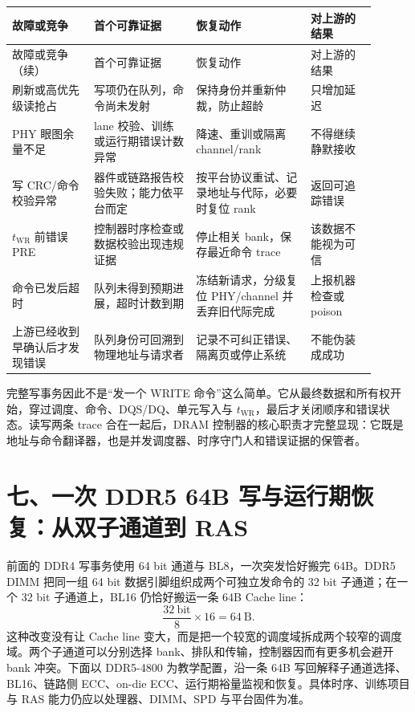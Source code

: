 \begin{longtable}{L{0.20\linewidth}L{0.25\linewidth}L{0.29\linewidth}L{0.16\linewidth}}
\toprule
故障或竞争 & 首个可靠证据 & 恢复动作 & 对上游的结果 \\
\midrule
\endfirsthead
\toprule
故障或竞争（续） & 首个可靠证据 & 恢复动作 & 对上游的结果 \\
\midrule
\endhead
刷新或高优先级读抢占 & 写项仍在队列，命令尚未发射 & 保持身份并重新仲裁，防止超龄 & 只增加延迟 \\\tablerowrule
PHY 眼图余量不足 & lane 校验、训练或运行期错误计数异常 & 降速、重训或隔离 channel/rank & 不得继续静默接收 \\\tablerowrule
写 CRC/命令校验异常 & 器件或链路报告校验失败；能力依平台而定 & 按平台协议重试、记录地址与代际，必要时复位 rank & 返回可追踪错误 \\\tablerowrule
$t_{\mathrm{WR}}$ 前错误 PRE & 控制器时序检查或数据校验出现违规证据 & 停止相关 bank，保存最近命令 trace & 该数据不能视为可信 \\\tablerowrule
命令已发后超时 & 队列未得到预期进展，超时计数到期 & 冻结新请求，分级复位 PHY/channel 并丢弃旧代际完成 & 上报机器检查或 poison \\\tablerowrule
上游已经收到早确认后才发现错误 & 队列身份可回溯到物理地址与请求者 & 记录不可纠正错误、隔离页或停止系统 & 不能伪装成成功 \\
\bottomrule
\end{longtable}

完整写事务因此不是“发一个 WRITE 命令”这么简单。它从最终数据和所有权开始，穿过调度、命令、DQS/DQ、单元写入与 $t_{\mathrm{WR}}$，最后才关闭顺序和错误状态。读写两条 trace 合在一起后，DRAM 控制器的核心职责才完整显现：它既是地址与命令翻译器，也是并发调度器、时序守门人和错误证据的保管者。
\section{七、一次 DDR5 64B 写与运行期恢复：从双子通道到 RAS}

前面的 DDR4 写事务使用 64 bit 通道与 BL8，一次突发恰好搬完 64B。DDR5 DIMM 把同一组 64 bit 数据引脚组织成两个可独立发命令的 32 bit 子通道；在一个 32 bit 子通道上，BL16 仍恰好搬运一条 64B Cache line：
\[
  \frac{32\ \mathrm{bit}}{8}\times 16=64\ \mathrm{B}.
\]
这种改变没有让 Cache line 变大，而是把一个较宽的调度域拆成两个较窄的调度域。两个子通道可以分别选择 bank、排队和传输，控制器因而有更多机会避开 bank 冲突。下面以 DDR5-4800 为教学配置，沿一条 64B 写回解释子通道选择、BL16、链路侧 ECC、on-die ECC、运行期裕量监视和恢复。具体时序、训练项目与 RAS 能力仍应以处理器、DIMM、SPD 与平台固件为准。\cite{micron-ddr5}

